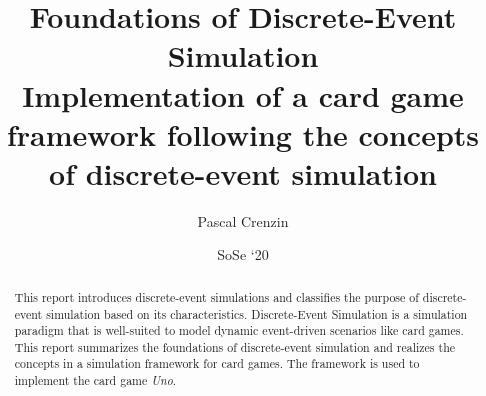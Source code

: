 \documentclass[10]{article}
\title{Foundations of Discrete-Event Simulation \\ \footnotesize{Implementation of a card game framework following the concepts of discrete-event simulation}}
\author{Pascal Crenzin}
\date{SoSe `20}
\begin{document}
	\maketitle
	\begin{abstract}
	This report introduces discrete-event simulations and classifies the purpose of discrete-event simulation based on its characteristics.
		Discrete-Event Simulation is a simulation paradigm that is well-suited to model dynamic event-driven scenarios like card games. This report summarizes the foundations of discrete-event simulation and realizes the concepts in a simulation framework for card games. The framework is used to implement the card game \textit{Uno}. 
	\end{abstract}
	\newpage
	\tableofcontents
	\newpage
  
  
%  	
%	
%	
%	




\end{document}
